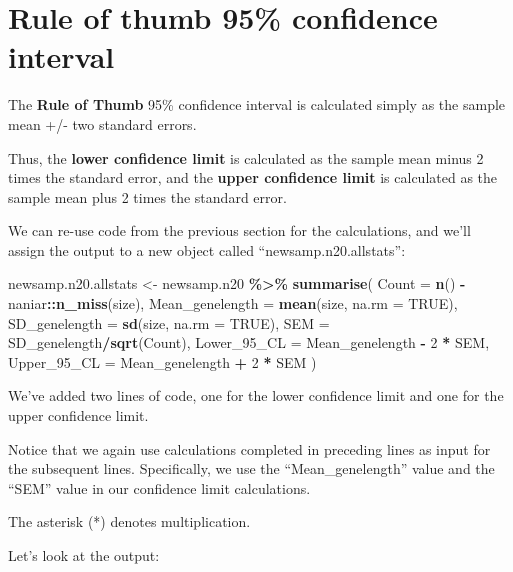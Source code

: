 \documentclass[
]{book}
\newenvironment{Shaded}{\begin{snugshade}}{\end{snugshade}}
\newcommand{\AttributeTok}[1]{\textcolor[rgb]{0.13,0.29,0.53}{#1}}
\newcommand{\ConstantTok}[1]{\textcolor[rgb]{0.56,0.35,0.01}{#1}}
\newcommand{\DecValTok}[1]{\textcolor[rgb]{0.00,0.00,0.81}{#1}}
\newcommand{\FunctionTok}[1]{\textcolor[rgb]{0.13,0.29,0.53}{\textbf{#1}}}
\newcommand{\NormalTok}[1]{#1}
\newcommand{\OtherTok}[1]{\textcolor[rgb]{0.56,0.35,0.01}{#1}}
\newcommand{\SpecialCharTok}[1]{\textcolor[rgb]{0.81,0.36,0.00}{\textbf{#1}}}
\begin{document}
\section{Rule of thumb 95\% confidence interval}\label{confint_rough}

The \textbf{Rule of Thumb} 95\% confidence interval is calculated simply as the sample mean +/- two standard errors.

Thus, the \textbf{lower confidence limit} is calculated as the sample mean minus 2 times the standard error, and the \textbf{upper confidence limit} is calculated as the sample mean plus 2 times the standard error.

We can re-use code from the previous section for the calculations, and we'll assign the output to a new object called ``newsamp.n20.allstats'':

\begin{Shaded}
\begin{Highlighting}[]
\NormalTok{newsamp.n20.allstats }\OtherTok{\textless{}{-}}\NormalTok{ newsamp.n20 }\SpecialCharTok{\%\textgreater{}\%}
  \FunctionTok{summarise}\NormalTok{(}
    \AttributeTok{Count =} \FunctionTok{n}\NormalTok{() }\SpecialCharTok{{-}}\NormalTok{ naniar}\SpecialCharTok{::}\FunctionTok{n\_miss}\NormalTok{(size),}
    \AttributeTok{Mean\_genelength =} \FunctionTok{mean}\NormalTok{(size, }\AttributeTok{na.rm =} \ConstantTok{TRUE}\NormalTok{),}
    \AttributeTok{SD\_genelength =} \FunctionTok{sd}\NormalTok{(size, }\AttributeTok{na.rm =} \ConstantTok{TRUE}\NormalTok{),}
    \AttributeTok{SEM =}\NormalTok{ SD\_genelength}\SpecialCharTok{/}\FunctionTok{sqrt}\NormalTok{(Count),}
    \AttributeTok{Lower\_95\_CL =}\NormalTok{ Mean\_genelength }\SpecialCharTok{{-}} \DecValTok{2} \SpecialCharTok{*}\NormalTok{ SEM,}
    \AttributeTok{Upper\_95\_CL =}\NormalTok{ Mean\_genelength }\SpecialCharTok{+} \DecValTok{2} \SpecialCharTok{*}\NormalTok{ SEM}
\NormalTok{  )}
\end{Highlighting}
\end{Shaded}

We've added two lines of code, one for the lower confidence limit and one for the upper confidence limit.

Notice that we again use calculations completed in preceding lines as input for the subsequent lines. Specifically, we use the ``Mean\_genelength'' value and the ``SEM'' value in our confidence limit calculations.

The asterisk (*) denotes multiplication.

Let's look at the output:
\end{document}
